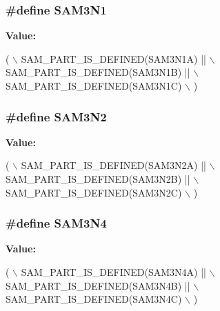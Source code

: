 \subsubsection[{S\+A\+M3\+N1}]{\setlength{\rightskip}{0pt plus 5cm}\#define S\+A\+M3\+N1}\label{group__sam__part__macros__group_gaf58a7d141f31d6db97223dfd62d92905}
{\bfseries Value\+:}
\begin{DoxyCode}
( \(\backslash\)
        SAM\_PART\_IS\_DEFINED(SAM3N1A) || \(\backslash\)
        SAM\_PART\_IS\_DEFINED(SAM3N1B) || \(\backslash\)
        SAM\_PART\_IS\_DEFINED(SAM3N1C) \(\backslash\)
        )
\end{DoxyCode}
\hypertarget{group__sam__part__macros__group_ga96514eddac4935925994ef85ca9d12ac}{}
\subsubsection[{S\+A\+M3\+N2}]{\setlength{\rightskip}{0pt plus 5cm}\#define S\+A\+M3\+N2}\label{group__sam__part__macros__group_ga96514eddac4935925994ef85ca9d12ac}
{\bfseries Value\+:}
\begin{DoxyCode}
( \(\backslash\)
        SAM\_PART\_IS\_DEFINED(SAM3N2A) || \(\backslash\)
        SAM\_PART\_IS\_DEFINED(SAM3N2B) || \(\backslash\)
        SAM\_PART\_IS\_DEFINED(SAM3N2C) \(\backslash\)
        )
\end{DoxyCode}
\hypertarget{group__sam__part__macros__group_ga1d47bffd90ddbb0dac3874edbafb3803}{}
\subsubsection[{S\+A\+M3\+N4}]{\setlength{\rightskip}{0pt plus 5cm}\#define S\+A\+M3\+N4}\label{group__sam__part__macros__group_ga1d47bffd90ddbb0dac3874edbafb3803}
{\bfseries Value\+:}
\begin{DoxyCode}
( \(\backslash\)
        SAM\_PART\_IS\_DEFINED(SAM3N4A) || \(\backslash\)
        SAM\_PART\_IS\_DEFINED(SAM3N4B) || \(\backslash\)
        SAM\_PART\_IS\_DEFINED(SAM3N4C) \(\backslash\)
        )
\end{DoxyCode}
\hypertarget{group__sam__part__macros__group_gaaa8d9ee5981c67997fbdf923247bcb68}{}
